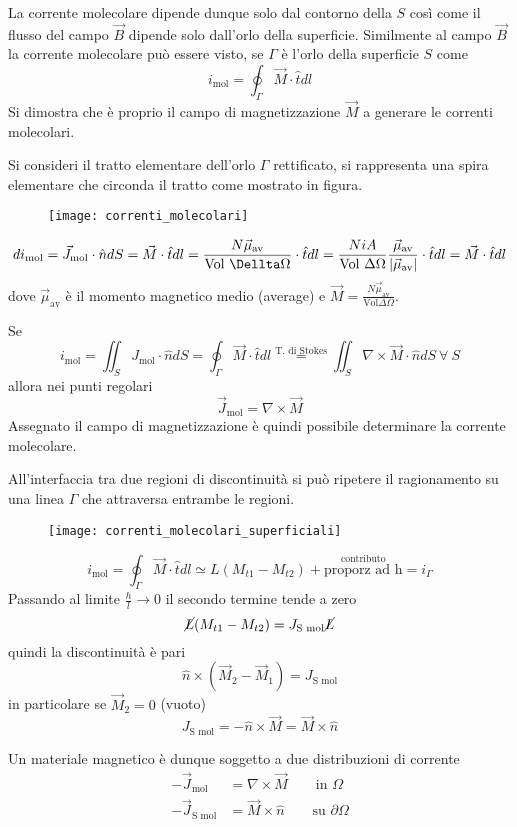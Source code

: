 La corrente molecolare dipende dunque solo dal contorno della $S$ così come il flusso
del campo $\vec{B}$ dipende solo dall'orlo della superficie. Similmente al campo $\vec{B}$
la corrente molecolare può essere visto, se $\Gamma$ è l'orlo della superficie $S$ come
$$
i_{\text{mol}} = \oint_\Gamma \vec{M}\cdot\hat{t} dl 
$$
Si dimostra che è proprio il campo di magnetizzazione $\vec{M}$ a generare le correnti
molecolari.

Si consideri il tratto elementare dell'orlo $\Gamma$ rettificato, si rappresenta una 
spira elementare che circonda il tratto come mostrato in figura.
\begin{figure}[H]
\centering
\texttt{[image: correnti\_molecolari]}
\end{figure}

$$
d i_\text{mol} = \vec{J}_\text{mol}\cdot\hat{n} dS = \vec{M}\cdot\hat{t}dl = \frac{N \vec{\mu}_\text{av}}{\text{Vol }\Dellta \Omega } \cdot \hat{t} dl = \frac{N i A}{\text{Vol }\Delta\Omega} \frac{\vec{\mu}_\text{av}}{|\vec{\mu}_\text{av}|}\cdot \hat{t}dl = \vec{M}\cdot\hat{t}dl
$$
dove $\vec{\mu}_\text{av}$ è il momento magnetico medio (average) e $\vec{M} = \frac{N\vec{\mu}_\text{av}}{\text{Vol}\Delta\Omega}$.

Se 
$$
i_\text{mol} = \iint_S J_\text{mol} \cdot\hat{n} dS = \oint_\Gamma \vec{M}\cdot\hat{t}dl \stackrel{\text{T. di Stokes}}{=} \iint_S \nabla\times\vec{M}\cdot\hat{n} dS \ \forall \ S
$$
allora nei punti regolari
$$
\vec{J}_\text{mol} = \nabla\times\vec{M}
$$
Assegnato il campo di magnetizzazione è quindi possibile determinare la corrente 
molecolare.

All'interfaccia tra due regioni di discontinuità si può ripetere il ragionamento su una
linea $\Gamma$ che attraversa entrambe le regioni.
\begin{figure}[H]
\centering
\texttt{[image: correnti\_molecolari\_superficiali]}
\end{figure}
$$
i_\text{mol} = \oint_\Gamma \vec{M}\cdot\hat{t}dl \simeq L(M_{t1} - M_{t2}) + \stackrel{\text{contributo}}{\text{proporz ad h}} = i_\Gamma 
$$
Passando al limite $\frac{h}{l}\to 0 $ il secondo termine tende a zero
$$
\cancel{L}(M_{t1} - M_{t2}) = J_\text{S mol} \cancel{L}
$$
quindi la discontinuità è pari
$$
\hat{n}\times(\vec{M}_2 - \vec{M}_1) = J_\text{S mol}
$$
in particolare se $\vec{M}_2 = 0$ (vuoto)
$$
J_\text{S mol} = -\hat{n}\times\vec{M} = \vec{M}\times\hat{n}
$$

Un materiale magnetico è dunque soggetto a due distribuzioni di corrente
\begin{align*}
-\vec{J}_\text{mol} &= \nabla\times\vec{M} \qquad \text{in }\Omega \\
-\vec{J}_\text{S mol} &= \vec{M}\times\hat{n} \qquad \text{su } \partial\Omega
\end{align*}

